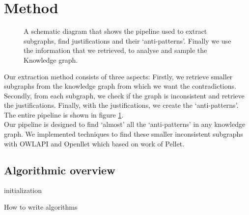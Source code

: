 \documentclass{article}
\begin{document}
\section{Method}
\begin{figure}[!t]
	\centering
	\caption{A schematic diagram that shows the pipeline used to extract subgraphs, find justifications and their `anti-patterns'. Finally 
		we use the information that we retrieved, to analyse and sample the Knowledge graph.}
	\label{fig:simplePipeline}
\end{figure}
Our extraction method consists of three aspects: Firstly, we retrieve smaller subgraphs from the knowledge graph from which we want the contradictions. Secondly, from each subgraph, we check if the graph is inconsistent and retrieve the justifications. Finally, with the justifications, we create the `anti-patterns'. The entire pipeline is shown in figure \ref{fig:simplePipeline}.\\
Our pipeline is designed to find `almost' all the `anti-patterns' in any knowledge graph. We implemented techniques to find these smaller inconsistent subgraphs with OWLAPI\cite{Horridge:2011} and Openllet\cite{Openllet:2019} which based on work of Pellet\cite{Pellet:2007}.\\
\subsection{Algorithmic overview}
\begin{algorithm}[H]
	initialization\;
	\caption{How to write algorithms}
\end{algorithm}
\end{document}
